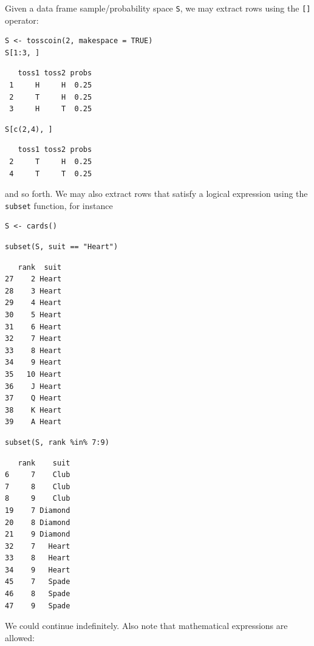 \documentclass[captions=tableheading]{scrbook}
\begin{document}
Given a data frame sample/probability space \texttt{S}, we may extract rows using the \texttt{[]} operator: 


\lstset{language=R}
\begin{lstlisting}
S <- tosscoin(2, makespace = TRUE) 
S[1:3, ]
\end{lstlisting}

\begin{verbatim}
   toss1 toss2 probs
 1     H     H  0.25
 2     T     H  0.25
 3     H     T  0.25
\end{verbatim}


\lstset{language=R}
\begin{lstlisting}
S[c(2,4), ]
\end{lstlisting}

\begin{verbatim}
   toss1 toss2 probs
 2     T     H  0.25
 4     T     T  0.25
\end{verbatim}

and so forth. We may also extract rows that satisfy a logical expression using the \texttt{subset} function, for instance 


\lstset{language=R}
\begin{lstlisting}
S <- cards()
\end{lstlisting}


\lstset{language=R}
\begin{lstlisting}
subset(S, suit == "Heart")
\end{lstlisting}


\begin{verbatim}
   rank  suit
27    2 Heart
28    3 Heart
29    4 Heart
30    5 Heart
31    6 Heart
32    7 Heart
33    8 Heart
34    9 Heart
35   10 Heart
36    J Heart
37    Q Heart
38    K Heart
39    A Heart
\end{verbatim}


\lstset{language=R}
\begin{lstlisting}
subset(S, rank %in% 7:9)
\end{lstlisting}


\begin{verbatim}
   rank    suit
6     7    Club
7     8    Club
8     9    Club
19    7 Diamond
20    8 Diamond
21    9 Diamond
32    7   Heart
33    8   Heart
34    9   Heart
45    7   Spade
46    8   Spade
47    9   Spade
\end{verbatim}

We could continue indefinitely. Also note that mathematical expressions are allowed: 
\end{document}
